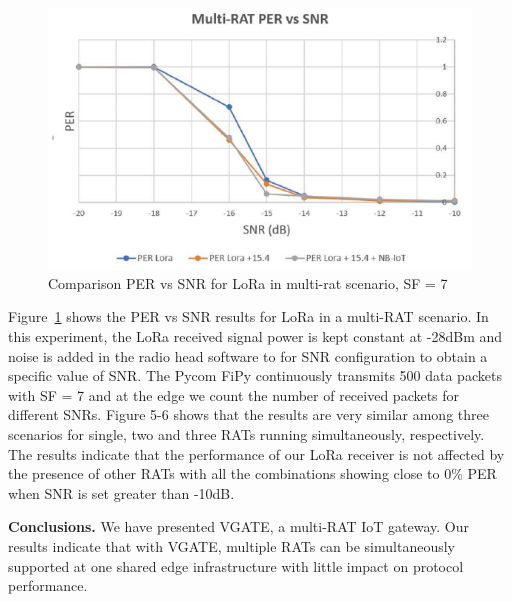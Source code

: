 \documentclass[10pt,emptycopyrightspace]{ewsn-proc}
\newcommand{\fakepar}[1]{\noindent\textbf{#1.}}
\begin{document}
\begin{figure}[h]
  \vspace{-0.3cm}
	\centering
	\includegraphics[width= 0.4 \textwidth]{5-6.png}
	\caption{Comparison PER vs SNR for LoRa in multi-rat scenario, SF = 7
}
	\label{fig:5-6}
\end{figure}


Figure~\ref{fig:5-6} shows the PER vs SNR results for LoRa in a
multi-RAT scenario. In this experiment, the LoRa received signal power
is kept constant at -28dBm and noise is added in the radio head
software to for SNR configuration to obtain a specific value of
SNR. The Pycom FiPy continuously transmits 500 data packets with SF =
7 and at the edge we count the number of received packets for
different SNRs. Figure 5-6 shows that the results are very similar
among three scenarios for single, two and three RATs running
simultaneously, respectively. The results indicate that the performance of our
LoRa receiver is not affected by the presence of other RATs with all
the combinations showing close to 0\% PER when SNR is set greater than
-10dB.

\fakepar{Conclusions} We have presented VGATE, a multi-RAT IoT gateway.
Our results indicate that with VGATE, multiple RATs can be
simultaneously supported at one shared edge infrastructure
with little impact on protocol performance.





%
%

\end{document}
